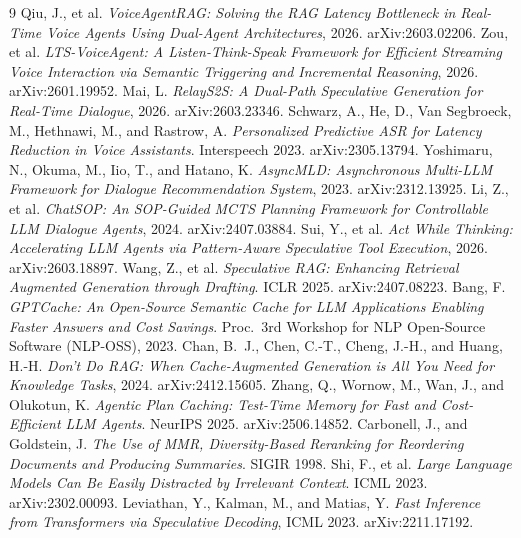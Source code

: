 \documentclass[10pt,twocolumn]{article}
\begin{document}
\footnotesize
\begin{thebibliography}{9}
\setlength{\itemsep}{0pt}
 Qiu, J., et al. \emph{VoiceAgentRAG: Solving the RAG Latency Bottleneck in Real-Time Voice Agents Using Dual-Agent Architectures}, 2026. arXiv:2603.02206.
 Zou, et al. \emph{LTS-VoiceAgent: A Listen-Think-Speak Framework for Efficient Streaming Voice Interaction via Semantic Triggering and Incremental Reasoning}, 2026. arXiv:2601.19952.
 Mai, L. \emph{RelayS2S: A Dual-Path Speculative Generation for Real-Time Dialogue}, 2026. arXiv:2603.23346.
 Schwarz, A., He, D., Van Segbroeck, M., Hethnawi, M., and Rastrow, A. \emph{Personalized Predictive ASR for Latency Reduction in Voice Assistants}. Interspeech 2023. arXiv:2305.13794.
 Yoshimaru, N., Okuma, M., Iio, T., and Hatano, K. \emph{AsyncMLD: Asynchronous Multi-LLM Framework for Dialogue Recommendation System}, 2023. arXiv:2312.13925.
 Li, Z., et al. \emph{ChatSOP: An SOP-Guided MCTS Planning Framework for Controllable LLM Dialogue Agents}, 2024. arXiv:2407.03884.
 Sui, Y., et al. \emph{Act While Thinking: Accelerating LLM Agents via Pattern-Aware Speculative Tool Execution}, 2026. arXiv:2603.18897.
 Wang, Z., et al. \emph{Speculative RAG: Enhancing Retrieval Augmented Generation through Drafting}. ICLR 2025. arXiv:2407.08223.
 Bang, F. \emph{GPTCache: An Open-Source Semantic Cache for LLM Applications Enabling Faster Answers and Cost Savings}. Proc.\ 3rd Workshop for NLP Open-Source Software (NLP-OSS), 2023.
 Chan, B.~J., Chen, C.-T., Cheng, J.-H., and Huang, H.-H. \emph{Don't Do RAG: When Cache-Augmented Generation is All You Need for Knowledge Tasks}, 2024. arXiv:2412.15605.
 Zhang, Q., Wornow, M., Wan, J., and Olukotun, K. \emph{Agentic Plan Caching: Test-Time Memory for Fast and Cost-Efficient LLM Agents}. NeurIPS 2025. arXiv:2506.14852.
 Carbonell, J., and Goldstein, J. \emph{The Use of MMR, Diversity-Based Reranking for Reordering Documents and Producing Summaries}. SIGIR 1998.
 Shi, F., et al. \emph{Large Language Models Can Be Easily Distracted by Irrelevant Context}. ICML 2023. arXiv:2302.00093.
 Leviathan, Y., Kalman, M., and Matias, Y. \emph{Fast Inference from Transformers via Speculative Decoding}, ICML 2023. arXiv:2211.17192.

\end{thebibliography}
\end{document}
